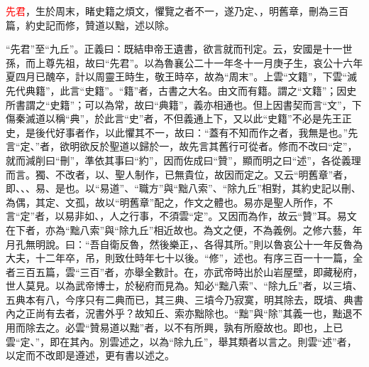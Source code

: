 \textcolor{red}{先君}，生於周末，睹史籍之煩文，懼覽之者不一，遂乃定、，明舊章，刪為三百篇，約史記而修，贊道以黜，述以除\CJKunderwave{\textcolor{red}{九丘}}。

{\noindent\shu{}\fzkt “先君”至“九丘”。正義曰：既結申帝王遺書，欲言就而刊定。云，安國是十一世孫，而上尊先祖，故曰“先君”。以為魯襄公二十一年冬十一月庚子生，哀公十六年夏四月已醜卒，計以周靈王時生，敬王時卒，故為“周末”。上雲“文籍”，下雲“滅先代典籍”，此言“史籍”。“籍”者，古書之大名。由文而有籍。謂之“文籍”；因史所書謂之“史籍”；可以為常，故曰“典籍”，義亦相通也。但上因書契而言“文”，下傷秦滅道以稱“典”，於此言“史”者，不但義通上下，又以此“史籍”不必是先王正史，是後代好事者作，以此懼其不一，故曰：“蓋有不知而作之者，我無是也。”先言“定、”者，欲明欲反於聖道以歸於一，故先言其舊行可從者。修而不改曰“定”，就而減削曰“刪”，準依其事曰“約”，因而佐成曰“贊”，顯而明之曰“述”，各從義理而言。獨、不改者，以、聖人制作，已無貴位，故因而定之。又云“明舊章”者，即、、、易、是也。以“易道”、“職方”與“黜八索”、“除九丘”相對，其約史記以刪、為偶，其定、文孤，故以“明舊章”配之，作文之體也。易亦是聖人所作，不言“定”者，以易非如、，人之行事，不須雲“定”。又因而為作，故云“贊”耳。易文在下者，亦為“黜八索”與“除九丘”相近故也。為文之便，不為義例。之修六藝，年月孔無明說。曰：“吾自衛反魯，然後樂正，、各得其所。”則以魯哀公十一年反魯為大夫，十二年卒，吊，則致仕時年七十以後。“修”，述也。有序三百一十一篇，全者三百五篇，雲“三百”者，亦舉全數計。在，亦武帝時出於山岩屋壁，即藏秘府，世人莫見。以為武帝博士，於秘府而見為。知必“黜八索”、“除九丘”者，以三墳、五典本有八，今序只有二典而已，其三典、三墳今乃寂寞，明其除去，既墳、典書內之正尚有去者，況書外乎？故知丘、索亦黜除也。“黜”與“除”其義一也，黜退不用而除去之。必雲“贊易道以黜”者，以不有所興，孰有所廢故也。即也，上已雲“定、”，即在其內。別雲述之，以為“除九丘”，舉其類者以言之。則雲“述”者，以定而不改即是遵述，更有書以述之。 \par}

